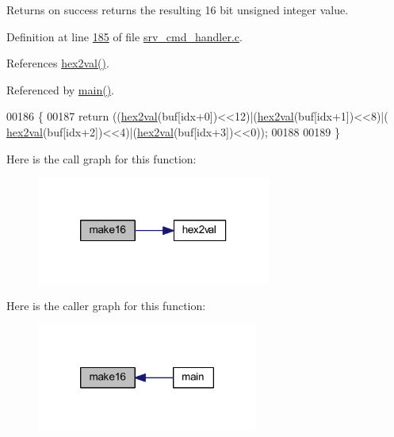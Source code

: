 \begin{DoxyReturn}{Returns}
on success returns the resulting 16 bit unsigned integer value. 

 
\end{DoxyReturn}


Definition at line \hyperlink{a00041_source_l00185}{185} of file \hyperlink{a00041_source}{srv\-\_\-cmd\-\_\-handler.\-c}.



References \hyperlink{a00041_source_l00165}{hex2val()}.



Referenced by \hyperlink{a00034_source_l00198}{main()}.


\begin{DoxyCode}
00186 \{
00187     \textcolor{keywordflow}{return} ((\hyperlink{a00008_gab120dc4bec6b4097a5cd3ebb91131c57}{hex2val}(buf[idx+0])<<12)|(\hyperlink{a00008_gab120dc4bec6b4097a5cd3ebb91131c57}{hex2val}(buf[idx+1])<<8)|(
      \hyperlink{a00008_gab120dc4bec6b4097a5cd3ebb91131c57}{hex2val}(buf[idx+2])<<4)|(\hyperlink{a00008_gab120dc4bec6b4097a5cd3ebb91131c57}{hex2val}(buf[idx+3])<<0));    
00188 
00189 \}
\end{DoxyCode}


Here is the call graph for this function\-:\nopagebreak
\begin{figure}[H]
\begin{center}
\leavevmode
\includegraphics[width=218pt]{d4/dee/a00008_ga1e74920f34a07a82cca58eab71ed12b3_cgraph}
\end{center}
\end{figure}




Here is the caller graph for this function\-:\nopagebreak
\begin{figure}[H]
\begin{center}
\leavevmode
\includegraphics[width=206pt]{d4/dee/a00008_ga1e74920f34a07a82cca58eab71ed12b3_icgraph}
\end{center}
\end{figure}


